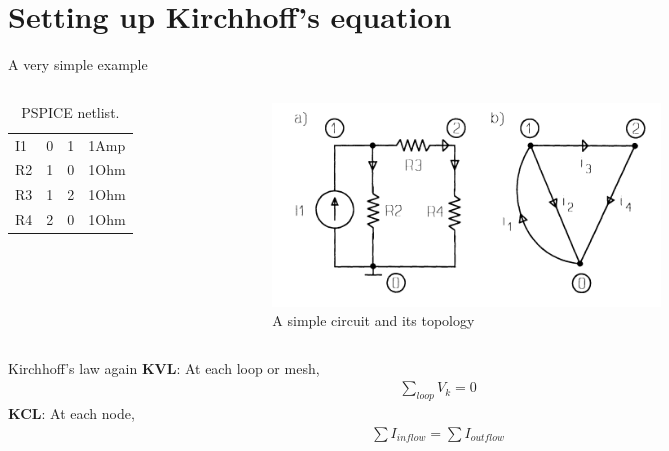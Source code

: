 \documentclass[xcolor=dvipsnames]{beamer}
\begin{document}
\section{Setting up Kirchhoff's equation}

\begin{frame}{A very simple example}
    \begin{columns}
        \begin{column}{.45\textwidth}
            \begin{table}[h!]
	    	\caption{PSPICE netlist.}
	    	\label{tab:netlist}
	   		 \begin{tabular}{l|l|l|l} %
	      		\hline
	      		I1 & 0 & 1 & 1Amp\\
	      		R2 & 1 & 0 & 1Ohm\\
	      		R3 & 1 & 2 & 1Ohm\\
	      		R4 & 2 & 0 & 1Ohm
	    	\end{tabular}
			\end{table}
        \end{column}
		\begin{column}{.75\textwidth}
         \begin{figure}[!ht]
  			\centering
    		\includegraphics[width=0.7\textwidth]{circuitt.png}
   			 \caption[figure 4]{A simple circuit and its topology}
    		\label{fig:eg4}
    	 \end{figure}
      	\end{column}
    \end{columns}
\end{frame}

\begin{frame}{Kirchhoff's law again}
	\textbf{KVL}: At each loop or mesh,
	\begin{align*}
		\sum_{loop} V_k = 0
	\end{align*}
	\textbf{KCL}: At each node,
	\begin{align*}
		\sum I_{inflow} = \sum I_{outflow}
	\end{align*}

\end{frame}
\end{document}
